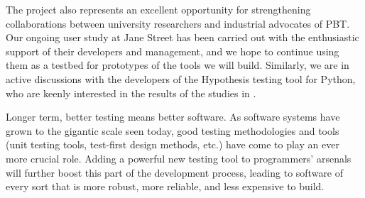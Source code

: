 The project also represents an excellent opportunity for strengthening
collaborations between university researchers and industrial advocates of PBT.  Our
ongoing user study at Jane Street has been carried out with the
enthusiastic support of their developers and management, and we hope
to continue using them as a testbed for prototypes of the tools we
will build.  Similarly, we are in active discussions with the
developers of the Hypothesis testing tool for Python, who are keenly
interested in the results of the studies in
.

Longer term, better testing means better software.  As software
systems have grown to the gigantic scale seen today, good testing
methodologies and tools (unit testing tools, test-first design
methods, etc.) have come to play an ever more crucial role.  Adding a
powerful new testing tool to programmers' arsenals will further boost
this part of the development process, leading to software of every
sort that is more robust, more reliable, and less expensive to build.





